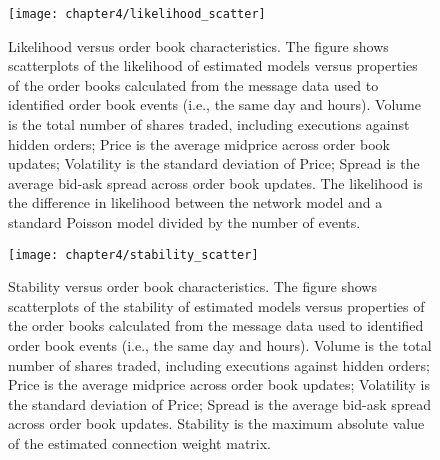 			\begin{figure}[p]
				\small
				\linespread{1}
				\centering
				\texttt{[image: chapter4/likelihood\_scatter]}
				\captionsetup{skip=-20pt, position=below, font=footnotesize, justification=justified, width=\linewidth}
				\caption[Likelihood versus order book characteristics]{Likelihood versus order book characteristics. The figure shows scatterplots of the likelihood of estimated models versus properties of the order books calculated from the message data used to identified order book events (i.e., the same day and hours). Volume is the total number of shares traded, including executions against hidden orders; Price is the average midprice across order book updates; Volatility is the standard deviation of Price; Spread is the average bid-ask spread across order book updates. The likelihood is the difference in likelihood between the network model and a standard Poisson model divided by the number of events.}
				\label{fig:likelihood_scatter}
			\end{figure}

			\begin{figure}[p]
				\small
				\linespread{1}
				\centering
				\texttt{[image: chapter4/stability\_scatter]}
				\captionsetup{skip=-20pt, position=below, font=footnotesize, justification=justified, width=\linewidth}
				\caption[Stability versus order book characteristics]{Stability versus order book characteristics. The figure shows scatterplots of the stability of estimated models versus properties of the order books calculated from the message data used to identified order book events (i.e., the same day and hours). Volume is the total number of shares traded, including executions against hidden orders; Price is the average midprice across order book updates; Volatility is the standard deviation of Price; Spread is the average bid-ask spread across order book updates. Stability is the maximum absolute value of the estimated connection weight matrix.}
				\label{fig:stability_scatter}
			\end{figure}

